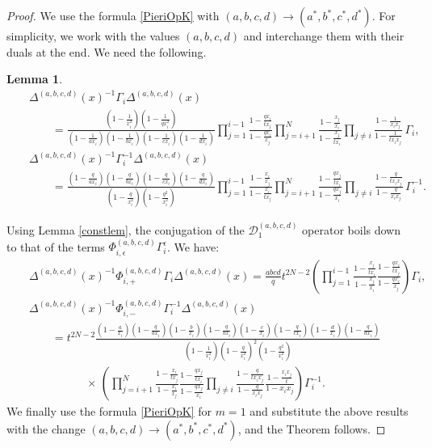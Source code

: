 \documentclass[12pt]{amsart}
\newtheorem{lemma}[thm]{Lemma}
\numberwithin{equation}{section}
\begin{document}
\begin{proof}
We use the formula \eqref{PieriOpK} with $(a,b,c,d)\to (a^*,b^*,c^*,d^*)$. For simplicity, we work with the values $(a,b,c,d)$ and interchange them with their duals at the end.
We need the following.
\begin{lemma}
\begin{eqnarray*}
&&\Delta^{(a,b,c,d)}(x)^{-1} \Gamma_i \Delta^{(a,b,c,d)}(x)\\
&&\qquad =\frac{(1-\frac{1}{x_i^2})(1-\frac{1}{q x_i^2})}{(1-\frac{1}{ax_i})(1-\frac{1}{bx_i})(1-\frac{1}{cx_i})(1-\frac{1}{dx_i})}\prod_{j=1}^{i-1} \frac{1-\frac{q x_i}{t x_j}}{1-\frac{q x_i}{x_j}} \prod_{j=i+1}^N\frac{1-\frac{x_j}{x_i}}{1-\frac{x_j}{t x_i}} \prod_{j\neq i} \frac{1-\frac{1}{x_ix_j}}{1-\frac{1}{tx_ix_j}}\, \Gamma_i,\\
&&\Delta^{(a,b,c,d)}(x)^{-1} \Gamma_i^{-1} \Delta^{(a,b,c,d)}(x)\\
&&\qquad =\frac{(1-\frac{q}{ax_i})(1-\frac{q}{bx_i})(1-\frac{q}{cx_i})(1-\frac{q}{dx_i})}{(1-\frac{q}{x_i^2})(1-\frac{q^2}{x_i^2})}\prod_{j=1}^{i-1}\frac{1-\frac{x_i}{ x_j}}{1-\frac{x_i}{t x_j}} \prod_{j=i+1}^N\frac{1-\frac{qx_j}{ tx_i}}{1-\frac{qx_j}{x_i}} \prod_{j\neq i} \frac{1-\frac{q}{t x_ix_j}}{1-\frac{q}{x_ix_j}}\, \Gamma_i^{-1}.
\end{eqnarray*}
\end{lemma}
Using Lemma \ref{constlem}, the conjugation of the ${\mathcal D}_1^{(a,b,c,d)}$ operator boils down to that of the terms $\Phi_{i,\epsilon}^{(a,b,c,d)} \Gamma_i^\epsilon$. We have:
\begin{eqnarray*} 
&&\Delta^{(a,b,c,d)}(x)^{-1} \Phi_{i,+}^{(a,b,c,d)} \Gamma_i\Delta^{(a,b,c,d)}(x)=\frac{a b c d}{q} t^{2N-2} \left( \prod_{j=1}^{i-1} \frac{1-\frac{x_j}{tx_i}}{1-\frac{x_j}{x_i}}\frac{1-\frac{qx_i}{t x_j}}{1-\frac{qx_i}{x_j}}\right) \Gamma_i,\\
&&\Delta^{(a,b,c,d)}(x)^{-1} \Phi_{i,-}^{(a,b,c,d)} \Gamma_i^{-1}\Delta^{(a,b,c,d)}(x)\\
&&\qquad =t^{2N-2} \frac{(1-\frac{a}{x_i})(1-\frac{q}{ax_i})(1-\frac{b}{x_i})(1-\frac{q}{bx_i})(1-\frac{c}{x_i})(1-\frac{q}{cx_i})(1-\frac{d}{x_i})(1-\frac{q}{dx_i})}{(1-\frac{1}{x_i^2})(1-\frac{q}{x_i^2})^2(1-\frac{q^2}{x_i^2})}\\
&&\qquad \qquad \quad \times\, \left(\prod_{j=i+1}^{N} \frac{1-\frac{x_i}{t x_j}}{1-\frac{x_i}{ x_j}}\frac{1-\frac{qx_j}{t x_i}}{1-\frac{qx_j}{x_i}}\prod_{j\neq i} \frac{1-\frac{q}{t x_ix_j}}{1-\frac{q}{x_ix_j}}\frac{1-\frac{x_ix_j}{t}}{1-x_ix_j}\right)\Gamma_i^{-1}.
\end{eqnarray*}
We finally use the formula \eqref{PieriOpK} for $m=1$ and substitute the above results with the change 
$(a,b,c,d)\to (a^*,b^*,c^*,d^*)$, and the Theorem follows.
\end{proof}
\end{document}
